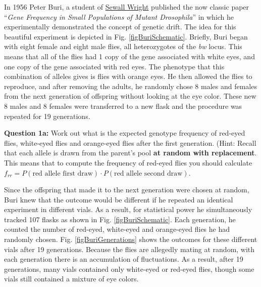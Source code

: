 \documentclass[12pt]{article}    %
\begin{document}
In 1956 Peter Buri, a student of
\href{https://en.wikipedia.org/wiki/Sewall_Wright}{Sewall Wright} published the
now classic paper ``\textit{Gene Frequency in Small Populations of Mutant
Drosophila}'' in which he experimentally demonstrated the concept of genetic
drift.  The idea for this beautiful experiment is depicted in
Fig. \ref{figBuriSchematic}. Briefly, Buri began with eight female and eight male
flies, all heterozygotes of the \textit{bw} locus. This means that all of the
flies had 1 copy of the gene associated with white eyes, and one copy of the
gene associated with  red eyes. The phenotype that this combination of alleles
gives is flies with orange eyes. He then allowed the flies to reproduce, and
after removing the adults, he randomly chose 8 males and females from the next
generation of offspring without looking at the eye color. These new 8 males and
8 females were transferred to a new flask and the procedure was repeated for 19
generations.

\begin{figure}[h!]
\end{figure}

\vspace{5mm}
\textbf{Question 1a:} Work out what is the expected genotype frequency of
red-eyed flies, white-eyed flies and orange-eyed flies after the first
generation. (Hint: Recall that each allele is drawn from the parent's pool
\textbf{at random with replacement}. This means that to compute the frequency of
red-eyed flies you should calculate $f_{rr} = P(\text{red allele first draw})
\cdot P(\text{red allele second draw})$.
\vspace{5mm}

Since the offspring that made it to the next generation were chosen at random,
Buri knew that the outcome would be different if he repeated an identical
experiment in different vials. As a result, for statistical power he simultaneously tracked
107 flasks as
shown in Fig. \ref{figBuriSchematic}. Each generation, he counted the number of red-eyed, white-eyed and orange-eyed flies he had randomly chosen.
Fig. \ref{figBuriGenerations} shows the outcomes for these different vials after 19
generations. Because the flies are allegedly mating at random, with each
generation there is an accumulation of fluctuations. As a result, after 19
generations, many vials contained only white-eyed or red-eyed flies, though
some vials still contained a mixture of eye colors.
\end{document}
